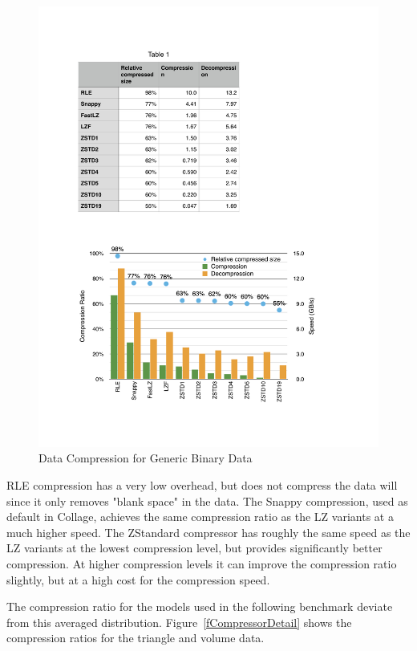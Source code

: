 \documentclass[10pt,journal,compsoc]{IEEEtran}
\newcommand{\fig}[1]{Figure~\ref{#1}}
\begin{document}
\begin{figure}[ht]\center
  \includegraphics[width=\columnwidth]{images/compressor}
  \caption{\label{fCompressor}Data Compression for Generic Binary Data}
\end{figure}

RLE compression has a very low overhead, but does not compress the data will
since it only removes "blank space" in the data. The Snappy compression, used as
default in Collage, achieves the same compression ratio as the LZ variants at a
much higher speed. The ZStandard compressor has roughly the same speed as the LZ
variants at the lowest compression level, but provides significantly better
compression. At higher compression levels it can improve the compression ratio
slightly, but at a high cost for the compression speed.

The compression ratio for the models used in the following benchmark deviate
from this averaged distribution. \fig{fCompressorDetail} shows the compression
ratios for the triangle and volume data.
\end{document}
